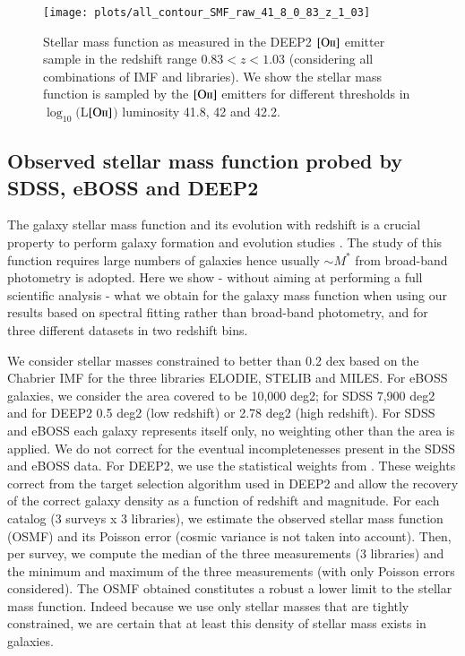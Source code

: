 \documentclass[onecolumn]{aa}
\newcommand{\OII}{$\left[\mathrm{O\textrm{\textsc{ii}}}\right]$\xspace}
\begin{document}
\begin{figure}
\begin{center}
\texttt{[image: plots/all\_contour\_SMF\_raw\_41\_8\_0\_83\_z\_1\_03]}
\label{fig:LF:sampling}
\caption{Stellar mass function as measured in the DEEP2 \OII emitter sample in the redshift range $0.83<z<1.03$ (considering all combinations of IMF and libraries). 
We show the stellar mass function is sampled by the \OII emitters for different thresholds in $\log_{10}($L\OII$)$ luminosity 41.8, 42 and 42.2.}  
\end{center}
\end{figure}


\subsection{Observed stellar mass function probed by SDSS, eBOSS and DEEP2}
\label{subsec:sdss:stellarmassdensity}

The galaxy stellar mass function and its evolution with redshift is a crucial property to perform galaxy formation and evolution studies \citep{2006ApJ...651..120B,2010A&A...523A..13P,Maraston2013,Ilbert2013SMF,2016MNRAS.455.4122B,2017MNRAS.466..228E}. 
The study of this function requires large numbers of galaxies hence usually $\sim M^{*}$ from broad-band photometry is adopted. 
Here we show - without aiming at performing a full scientific analysis - what we obtain for the galaxy mass function when using our results based on spectral fitting rather than broad-band photometry, and for three different datasets in two redshift bins.

We consider stellar masses constrained to better than 0.2 dex based on the Chabrier IMF for the three libraries ELODIE, STELIB and MILES. 
For eBOSS galaxies, we consider the area covered to be 10,000 deg2; for SDSS 7,900 deg2 and for DEEP2 0.5 deg2 (low redshift) or 2.78 deg2 (high redshift).
For SDSS and eBOSS each galaxy represents itself only, no weighting other than the area is applied. 
We do not correct for the eventual incompletenesses present in the SDSS and eBOSS data. 
For DEEP2, we use the statistical weights from \citet{Comparat2016LFs}. These weights correct from the target selection algorithm used in DEEP2 and allow the recovery of the correct galaxy density as a function of redshift and magnitude. 
For each catalog (3 surveys x 3 libraries), we estimate the observed stellar mass function (OSMF) and its Poisson error (cosmic variance is not taken into account). 
Then, per survey, we compute the median of the three measurements (3 libraries) and the minimum and maximum of the three measurements (with only Poisson errors considered). 
The OSMF obtained constitutes a robust a lower limit to the stellar mass function. 
Indeed because we use only stellar masses that are tightly constrained, we are certain that at least this density of stellar mass exists in galaxies.
\end{document}
